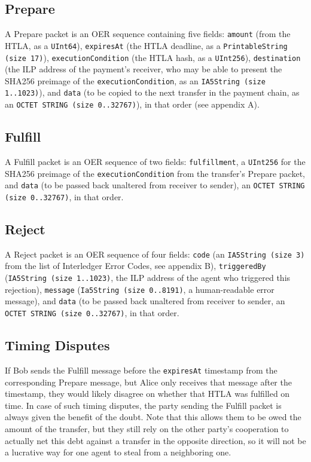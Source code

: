 \documentclass[11pt,twoside,a4paper]{article}
\begin{document}
\subsection{Prepare}
A Prepare packet is an OER sequence containing five fields:
{\tt amount} (from the HTLA, as a {\tt UInt64}),
{\tt expiresAt} (the HTLA deadline, as a {\tt PrintableString (size 17)}),
{\tt executionCondition} (the HTLA hash, as a {\tt UInt256}),
{\tt destination} (the ILP address of the payment's receiver, who may be able to present the SHA256 preimage of the {\tt executionCondition}, as an {\tt IA5String (size 1..1023)}), and
{\tt data} (to be copied to the next transfer in the payment chain, as an {\tt OCTET STRING (size 0..32767)}),
in that order (see appendix A).

\subsection{Fulfill}
A Fulfill packet is an OER sequence of two fields:
{\tt fulfillment}, a {\tt UInt256} for the SHA256 preimage of the {\tt executionCondition} from the transfer's Prepare packet,
and {\tt data} (to be passed back unaltered from receiver to sender), an {\tt OCTET STRING (size 0..32767)}, in that order.

\subsection{Reject}
A Reject packet is an OER sequence of four fields:
{\tt code} (an {\tt IA5String (size 3)} from the list of Interledger Error Codes, see appendix B),
{\tt triggeredBy} ({\tt IA5String (size 1..1023)}, the ILP address of the agent who triggered this rejection),
{\tt message} ({\tt Ia5String (size 0..8191)}, a human-readable error message),
and {\tt data} (to be passed back unaltered from receiver to sender, an {\tt OCTET STRING (size 0..32767)}, in that order.

\subsection{Timing Disputes}
If Bob sends the Fulfill message before the {\tt expiresAt} timestamp from the corresponding Prepare message, but Alice only receives that message after the
timestamp, they would likely disagree on whether that HTLA was fulfilled on time. In case of such timing disputes, the party sending the Fulfill
packet is always given the benefit of the doubt. Note that this allows them to be owed the amount of the transfer, but they still rely on the other party's
cooperation to actually net this debt against a transfer in the opposite direction, so it will not be a lucrative way for one agent to steal from a neighboring one.
\end{document}
